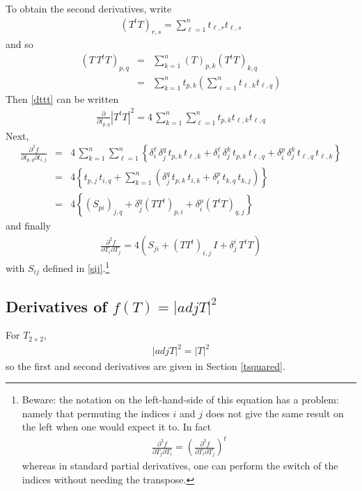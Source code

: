 \documentclass{report}
\begin{document}
\noindent To obtain the second derivatives, write
\begin{eqnarray}
\left( T^t T \right)_{r,s} = \sum_{\ell=1}^n t_{\ell,r} t_{\ell,s} 
\end{eqnarray}
and so
\begin{eqnarray}
\left( T \, T^t T \right)_{p,q} & = & \sum_{k=1}^n (T)_{p,k} \left( T^t T \right)_{k,q} \\
 & = & \sum_{k=1}^n t_{p,k} \left( \sum_{\ell=1}^n t_{\ell,k} t_{\ell,q} \right)
\end{eqnarray}
Then \ref{dttt} can be written
\begin{eqnarray}
\frac{\partial}{\partial t_{p,q}} |T^t T|^2 = 4 \, \sum_{k=1}^n \sum_{\ell=1}^n  t_{p,k} t_{\ell,k} t_{\ell,q} 
\end{eqnarray}
Next,
\begin{eqnarray} 
\frac{\partial^2 f}{\partial t_{p,q} \partial t_{i,j}} & = & 4\, \sum_{k=1}^n \sum_{\ell=1}^n  \left\{ \delta_i^\ell \, \delta_j^q \, t_{p,k} \, t_{\ell,k} + \delta_i^\ell \, \delta_j^k \, t_{p,k} \, t_{\ell,q} + \delta_i^p \, \delta_j^k \, t_{\ell,q} \, t_{\ell,k} \right\} \nonumber \\
 & = & 4 \left\{ t_{p,j} \, t_{i,q} + \sum_{k=1}^n \left( \delta_j^q \, t_{p,k} \, t_{i,k} + \delta_i^p \, t_{k,q} \, t_{k,j} \right) \right\} \\
& = & 4 \left\{ \left( S_{pi} \right)_{j,q} + \delta_j^q (T T^t)_{p,i} + \delta_i^p (T^t T)_{q,j}\right\}
\end{eqnarray}
and finally
\begin{eqnarray}
\label{hessttt}
\frac{\partial^2 f}{\partial T_i \partial T_j} = 4 \left( S_{ji} + (T T^t)_{i,j} \, I + \delta_j^i \, T^t T \right)
\end{eqnarray}
with $S_{ij}$ defined in \ref{sij}.\footnote{Beware: the notation on the left-hand-side of this equation has a problem: namely that permuting the indices $i$ and $j$ 
does not give the same result on the left when one would expect it to. In fact
\begin{eqnarray}
\frac{\partial^2 f}{\partial T_j \partial T_i} = \left( \frac{\partial^2 f}{\partial T_i \partial T_j} \right)^t
\end{eqnarray}
whereas in standard partial derivatives, one can perform the switch of the 
indices without needing the transpose.} \newline

\subsection{Derivatives of $f(T)=|adj T|^2$ \label{nrm-adj}}
For $T_{2 \times 2}$, 
\begin{eqnarray}
|adj T|^2 = |T|^2 
\end{eqnarray}
so the first and second derivatives are given in Section \ref{tsquared}. \newline
\end{document}
